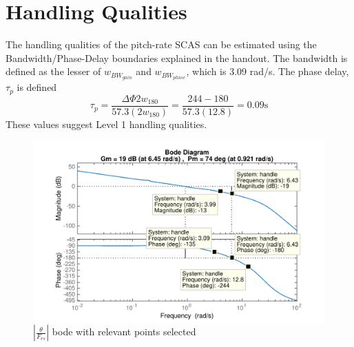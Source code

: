 \documentclass[12pt]{article}
\begin{document}
\section{Handling Qualities}
The handling qualities of the pitch-rate SCAS can be estimated using the Bandwidth/Phase-Delay boundaries explained in the handout. The bandwidth is defined as the lesser of $w_{BW_{gain}}$ and $w_{BW_{phase}}$, which is 3.09 rad/s. The phase delay, $\tau_p$ is defined
\begin{equation*}
\tau_p = \dfrac{\Delta \Phi 2w_{180}}{57.3 (2w_{180})} = \dfrac{244-180}{57.3 (12.8)} = 0.09 \mbox{s}
\end{equation*}
These values suggest Level 1 handling qualities.
\begin{figure}[h!]
\begin{center}
\includegraphics[height=.35\textheight]{figures/handling}
\caption{$|\frac{\theta}{F_{es}}|$ bode with relevant points selected}
\end{center}
\end{figure}
\end{document}
